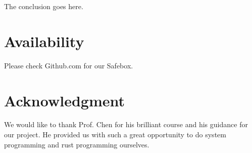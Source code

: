 \documentclass[conference,compsoc]{IEEEtran}
\begin{document}
	The conclusion goes here.

\section{Availability}

	Please check Github.com for our Safebox.

\section*{Acknowledgment}
	We would like to thank Prof. Chen for his brilliant course and his guidance for our project. He provided us with such a great opportunity to do system programming and rust programming ourselves. 






\end{document}

